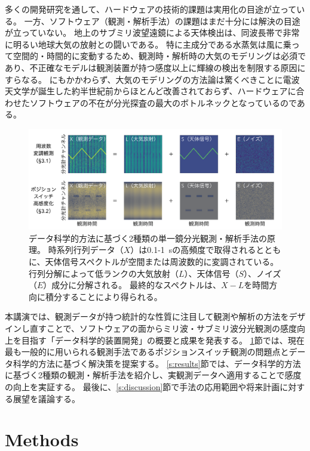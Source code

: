 \documentclass[a4paper,10pt,oneside,twocolumn,notitlepage,final]{jarticle}
\begin{document}
多くの開発研究を通して、ハードウェアの技術的課題は実用化の目途が立っている。
一方、ソフトウェア（観測・解析手法）の課題はまだ十分には解決の目途が立っていない。
地上のサブミリ波望遠鏡による天体検出は、同波長帯で非常に明るい地球大気の放射との闘いである。
特に主成分である水蒸気は風に乗って空間的・時間的に変動するため、観測時・解析時の大気のモデリングは必須であり、不正確なモデルは観測装置が持つ感度以上に輝線の検出を制限する原因にすらなる。
にもかかわらず、大気のモデリングの方法論は驚くべきことに電波天文学が誕生した約半世紀前からほとんど改善されておらず、ハードウェアに合わせたソフトウェアの不在が分光探査の最大のボトルネックとなっているのである。

\begin{figure}[t]
    \centering
    \includegraphics[width=\textwidth]{figures/figure-1}
    \caption{
        データ科学的方法に基づく2種類の単一鏡分光観測・解析手法の原理。
        時系列行列データ（$X$）は0.1-1~sの高頻度で取得されるとともに、天体信号スペクトルが空間または周波数的に変調されている。
        行列分解によって低ランクの大気放射（$L$）、天体信号（$S$）、ノイズ（$E$）成分に分解される。
        最終的なスペクトルは、$X-L$を時間方向に積分することにより得られる。
    }
    \label{fig:1}
\end{figure}

本講演では、観測データが持つ統計的な性質に注目して観測や解析の方法をデザインし直すことで、ソフトウェアの面からミリ波・サブミリ波分光観測の感度向上を目指す「データ科学的装置開発」の概要と成果を発表する。
\ref{s:methods}節では、現在最も一般的に用いられる観測手法であるポジションスイッチ観測の問題点とデータ科学的方法に基づく解決策を提案する。
\ref{s:results}節では、データ科学的方法に基づく2種類の観測・解析手法を紹介し、実観測データへ適用することで感度の向上を実証する。
最後に、\ref{s:discussion}節で手法の応用範囲や将来計画に対する展望を議論する。

\section{Methods}
\label{s:methods}
\end{document}
